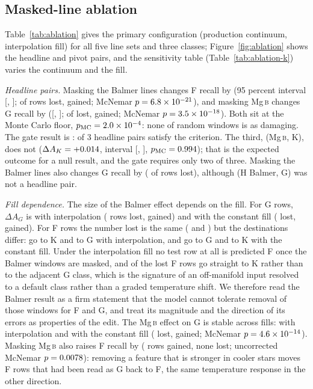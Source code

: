 \documentclass[11pt,a4paper]{article}
\newcommand{\Mgb}{Mg\,\textsc{b}\xspace}
\newcommand{\dA}{\Delta A}
\begin{document}
\subsection{Masked-line ablation}
\label{subsec:results-ablation}

Table~\ref{tab:ablation} gives the primary configuration (production continuum, interpolation fill) for all five line sets and three classes; Figure~\ref{fig:ablation} shows the headline and pivot pairs, and the sensitivity table (Table~\ref{tab:ablation-k}) varies the continuum and the fill.

\emph{Headline pairs.} Masking the Balmer lines changes F recall by \ablPrimHbFDelta{} (95 percent interval [\ablPrimHbFCiLo, \ablPrimHbFCiHi]; \ablPrimHbFLost{} of \ablPrimHbFN{} rows lost, \ablPrimHbFGained{} gained; McNemar $p = 6.8\times10^{-21}$), and masking \Mgb changes G recall by \ablPrimMgGDelta{} ([\ablPrimMgGCiLo, \ablPrimMgGCiHi]; \ablPrimMgGLost{} of \ablPrimMgGN{} lost, \ablPrimMgGGained{} gained; McNemar $p = 3.5\times10^{-18}$). Both sit at the Monte Carlo floor, $p_{\mathrm{MC}} = 2.0\times10^{-4}$: none of \ablNControls{} random windows is as damaging. The gate result is \ablGateStatus: \ablGatePassed{} of 3 headline pairs satisfy the criterion. The third, (\Mgb, K), does not ($\dA_K = \ablPrimMgKDelta$, interval [\ablPrimMgKCiLo, \ablPrimMgKCiHi], $p_{\mathrm{MC}} = 0.994$); that is the expected outcome for a null result, and the gate requires only two of three. Masking the Balmer lines also changes G recall by \ablPrimHbGDelta{} (\ablPrimHbGLost{} of \ablPrimHbGN{} rows lost), although (H Balmer, G) was not a headline pair.

\emph{Fill dependence.} The size of the Balmer effect depends on the fill. For G rows, $\dA_G$ is \ablPrimHbGDelta{} with interpolation (\ablPrimHbGLost{} rows lost, \ablPrimHbGGained{} gained) and \ablConstHbGDelta{} with the constant fill (\ablConstHbGLost{} lost, \ablConstHbGGained{} gained). For F rows the number lost is the same (\ablPrimHbFLost{} and \ablConstHbFLost) but the destinations differ: \ablDestPrimHbFToK{} go to K and \ablDestPrimHbFToG{} to G with interpolation, and \ablDestConstHbFToG{} go to G and \ablDestConstHbFToK{} to K with the constant fill. Under the interpolation fill no test row at all is predicted F once the Balmer windows are masked, and \ablDestPrimHbFToK{} of the \ablPrimHbFLost{} lost F rows go straight to K rather than to the adjacent G class, which is the signature of an off-manifold input resolved to a default class rather than a graded temperature shift. We therefore read the Balmer result as a firm statement that the model cannot tolerate removal of those windows for F and G, and treat its magnitude and the direction of its errors as properties of the edit. The \Mgb effect on G is stable across fills: \ablPrimMgGDelta{} with interpolation and \ablConstMgGDelta{} with the constant fill (\ablConstMgGLost{} lost, \ablConstMgGGained{} gained; McNemar $p = 4.6\times10^{-14}$). Masking \Mgb also raises F recall by \ablPrimMgFDelta{} (\ablPrimMgFGained{} rows gained, none lost; uncorrected McNemar $p = 0.0078$): removing a feature that is stronger in cooler stars moves F rows that had been read as G back to F, the same temperature response in the other direction.
\end{document}

